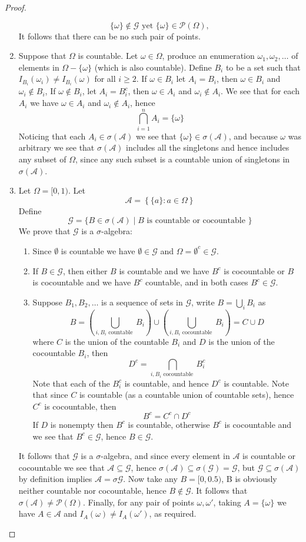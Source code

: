 \documentclass[11pt]{article}
\newcommand{\A}{\mathcal{A}}
\newcommand{\G}{\mathcal{G}}
\newcommand{\seq}{\subseteq}
\newcommand{\om}{\omega}
\newcommand{\Om}{\Omega}
\newcommand{\es}{\emptyset}
\newcommand{\mc}{\mathcal}
\newcommand{\un}{\cup}
\newcommand{\ic}{\cap}
\begin{document}
\begin{proof}
\begin{enumerate}
        \[ \{ \om \} \notin \G \text { yet } \{ \om \} \in \mc P (\Om), \]
        It follows that there can be no such pair of points.
        \item Suppose that $\Om$ is countable. Let $\om \in \Om$, produce an enumeration $\om_1, \om_2, \ldots$ of elements in $\Om - \{ \om \}$ (which is also countable). Define $B_{i}$ to be a set such that $I_{B_i} (\om_i) \neq I_{B_i} (\om)$ for all $i \geq 2$. If $\om \in B_i$ let $A_i = B_i$, then $\om \in B_i$ and $\om_i \notin B_i$, If $\om \notin B_i$, let $A_i = B_i^{c}$, then $\om \in A_i$ and $\om_i \notin A_i$. We see that for each $A_{i}$ we have $\om \in A_i$ and $\om_i \notin A_i$, hence
        \[ \bigcap_{i=1}^{n} A_i = \{ \om \} \]
        Noticing that each $A_i \in \sigma (\A)$ we see that $\{ \om \} \in \sigma (\A)$, and because $\om$ was arbitrary we see that $\sigma (\A)$ includes all the singletons and hence includes any subset of $\Om$, since any such subset is a countable union of singletons in $\sigma (\A)$. 
        \item Let $\Om = [0, 1)$. Let 
        \[ \A = \left \{ \{ a \} : a \in \Om \right \} \]
        Define
        \[ \G = \{ B \in \sigma (\A) \mid B \text { is countable  or cocountable    } \} \]
        We prove that $\G$ is a $\sigma$-algebra:
        \begin{enumerate}
            \item Since $\es$ is countable we have $\es \in \G$ and $\Om = \es^{c} \in \G$.
            \item If $B \in \G$, then either $B$ is countable and we have $B^{c}$ is cocountable or $B$ is cocountable and we have $B^{c}$ countable, and in both cases $B^{c} \in \G$. 
            \item Suppose $B_1, B_2, \ldots$ is a sequence of sets in $\G$, write $B = \bigcup_i B_i$ as
            \[ B = \left ( \bigcup_{i, B_i \text { countable }} B_i \right ) \un \left ( \bigcup_{i, B_i \text { cocountable }} B_i \right ) = C \un D \]
            where $C$ is the union of the countable $B_i$ and $D$ is the union of the cocountable $B_i$, then
            \[ D^{c} = \bigcap_{i, B_i \text { cocountable }} B_i^{c}  \]
            Note that each of the $B_i^{c}$ is countable, and hence $D^{c}$ is countable. Note that since $C$ is countable (as a countable union of countable sets), hence $C^{c}$ is cocountable, then
            \[ B^{c} = C^{c} \ic D^{c} \]
            If $D$ is nonempty then $B^{c}$ is countable, otherwise $B^{c}$ is cocountable and we see that $B^c \in \G$, hence $B \in \G$.
        \end{enumerate}
        It follows that $\G$ is a $\sigma$-algebra, and since every element in $\A$ is countable or cocountable we see that $\A \seq \G$, hence $\sigma (\A) \seq \sigma (\G) = \G$, but $\G \seq \sigma (\A)$ by definition implies $\A = \sigma \G$. Now take any $B = [0, 0.5)$, B is obviously neither countable nor cocountable, hence $B \notin \G$. It follows that $\sigma (\A) \neq \mc P (\Om)$. Finally, for any pair of points $\om, \om'$, taking $A = \{ \om \}$ we have $A \in \A$ and $I_A (\om) \neq I_A (\om')$, as required.
    \end{enumerate}
\end{proof}
\end{document}
